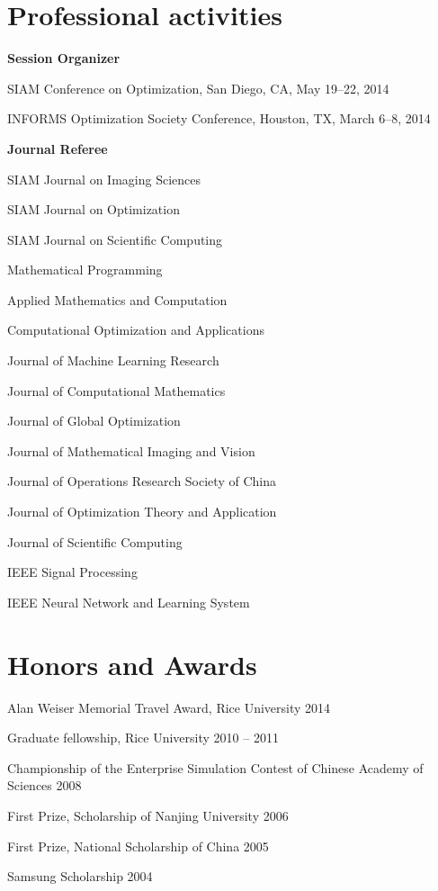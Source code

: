 \documentclass[letterpaper]{article}
\renewenvironment{itemize}{
  \begin{list}{}{
    \setlength{\leftmargin}{1.5em}
  }
}{
  \end{list}
}
\begin{document}
\section*{Professional activities}
\textbf{Session Organizer}
\begin{itemize}\setlength{\itemsep}{-1.5pt}
\item SIAM Conference on Optimization, San Diego, CA, May 19--22, 2014
\item INFORMS Optimization Society Conference, Houston, TX, March 6--8, 2014
\end{itemize}
\textbf{Journal Referee} 
\begin{itemize}\setlength{\itemsep}{-1.5pt}
\item SIAM Journal on Imaging Sciences
\item SIAM Journal on Optimization 
\item SIAM Journal on Scientific Computing
\item Mathematical Programming
\item Applied Mathematics and Computation
\item Computational Optimization and Applications
\item Journal of Machine Learning Research
\item Journal of Computational Mathematics
\item Journal of Global Optimization
\item Journal of Mathematical Imaging and Vision
\item Journal of Operations Research Society of China
\item Journal of Optimization Theory and Application
\item Journal of Scientific Computing 
\item IEEE Signal Processing
\item IEEE Neural Network and Learning System
\end{itemize}


\section*{Honors and Awards}
\begin{itemize}\setlength{\itemsep}{-1.5pt}
\item Alan Weiser Memorial Travel Award, Rice University \hfill 2014
\item Graduate fellowship, {Rice University} \hfill 2010 -- 2011
\item Championship of the Enterprise Simulation Contest of {Chinese Academy of Sciences} \hfill 2008
\item First Prize, Scholarship  of {Nanjing University} \hfill 2006
\item First Prize, National Scholarship of China \hfill 2005
\item Samsung Scholarship \hfill 2004

\end{itemize}
\end{document}
